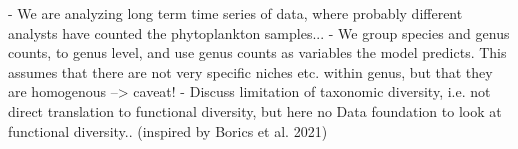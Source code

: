 

- We are analyzing long term time series of data, where probably different analysts have counted the phytoplankton samples...
- We group species and genus counts, to genus level, and use genus counts as variables the model predicts. This assumes that there are not very specific niches etc. within genus, but that they are homogenous --> caveat!
- Discuss limitation of taxonomic diversity, i.e. not direct translation to functional diversity, but here no Data foundation to look at functional diversity.. (inspired by Borics et al. 2021)













